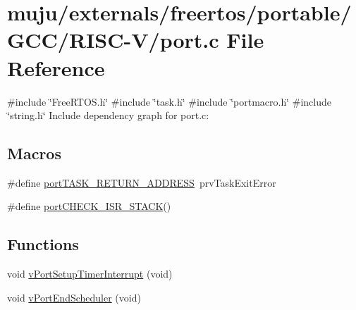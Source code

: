 \hypertarget{externals_2freertos_2portable_2_g_c_c_2_r_i_s_c-_v_2port_8c}{}\section{muju/externals/freertos/portable/\+G\+C\+C/\+R\+I\+S\+C-\/\+V/port.c File Reference}
\label{externals_2freertos_2portable_2_g_c_c_2_r_i_s_c-_v_2port_8c}
{\ttfamily \#include \char`\"{}Free\+R\+T\+O\+S.\+h\char`\"{}}\newline
{\ttfamily \#include \char`\"{}task.\+h\char`\"{}}\newline
{\ttfamily \#include \char`\"{}portmacro.\+h\char`\"{}}\newline
{\ttfamily \#include \char`\"{}string.\+h\char`\"{}}\newline
Include dependency graph for port.\+c\+:
\subsection*{Macros}
\begin{DoxyCompactItemize}
\item 
\#define \hyperlink{externals_2freertos_2portable_2_g_c_c_2_r_i_s_c-_v_2port_8c_a254a1ddd7499c6ec36b38e2fc3486b80}{port\+T\+A\+S\+K\+\_\+\+R\+E\+T\+U\+R\+N\+\_\+\+A\+D\+D\+R\+E\+SS}~prv\+Task\+Exit\+Error
\item 
\#define \hyperlink{externals_2freertos_2portable_2_g_c_c_2_r_i_s_c-_v_2port_8c_a675a9ea33bf706283cbc295bfff06335}{port\+C\+H\+E\+C\+K\+\_\+\+I\+S\+R\+\_\+\+S\+T\+A\+CK}()
\end{DoxyCompactItemize}
\subsection*{Functions}
\begin{DoxyCompactItemize}
\item 
void \hyperlink{externals_2freertos_2portable_2_g_c_c_2_r_i_s_c-_v_2port_8c_a4649001ea4d29b80759e6eca4bba58eb}{v\+Port\+Setup\+Timer\+Interrupt} (void)
\item 
void \hyperlink{externals_2freertos_2portable_2_g_c_c_2_r_i_s_c-_v_2port_8c_af76f3c0b44c5b5c06fc046a4ee1a6423}{v\+Port\+End\+Scheduler} (void)
\end{DoxyCompactItemize}
